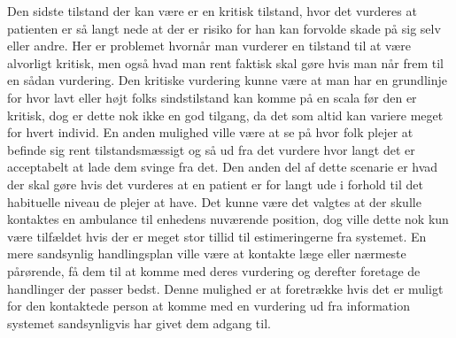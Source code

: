 Den sidste tilstand der kan være er en kritisk tilstand, hvor det vurderes at patienten er så langt nede at der er risiko for han kan forvolde skade på sig selv eller andre.
Her er problemet hvornår man vurderer en tilstand til at være alvorligt kritisk, men også hvad man rent faktisk skal gøre hvis man når frem til en sådan vurdering.
Den kritiske vurdering kunne være at man har en grundlinje for hvor lavt eller højt folks sindstilstand kan komme på en scala før den er kritisk, dog er dette nok ikke en god tilgang, da det som altid kan variere meget for hvert individ.
En anden mulighed ville være at se på hvor folk plejer at befinde sig rent tilstandsmæssigt og så ud fra det vurdere hvor langt det er acceptabelt at lade dem svinge fra det.
Den anden del af dette scenarie er hvad der skal gøre hvis det vurderes at en patient er for langt ude i forhold til det habituelle niveau de plejer at have.
Det kunne være det valgtes at der skulle kontaktes en ambulance til enhedens nuværende position, dog ville dette nok kun være tilfældet hvis der er meget stor tillid til estimeringerne fra systemet.
En mere sandsynlig handlingsplan ville være at kontakte læge eller nærmeste pårørende, få dem til at komme med deres vurdering og derefter foretage de handlinger der passer bedst.
Denne mulighed er at foretrække hvis det er muligt for den kontaktede person at komme med en vurdering ud fra information systemet sandsynligvis har givet dem adgang til.
